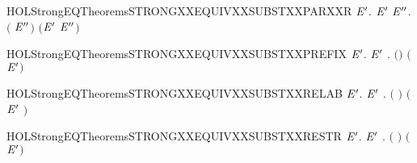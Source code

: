 \newcommand{\HOLStrongEQTheoremsSTRONGXXEQUIVXXSUBSTXXPARXXL}{\UseVerbatim{HOLStrongEQTheoremsSTRONGXXEQUIVXXSUBSTXXPARXXL}}
\begin{SaveVerbatim}{HOLStrongEQTheoremsSTRONGXXEQUIVXXSUBSTXXPARXXR}
\HOLTokenTurnstile{} \HOLSymConst{\HOLTokenForall{}} \ensuremath{\HOLBoundVar{E}\sp{\prime}}.
         \ensuremath{\HOLBoundVar{E}\sp{\prime}} \HOLSymConst{\HOLTokenImp{}}
       \HOLSymConst{\HOLTokenForall{}}\ensuremath{\HOLBoundVar{E}\sp{\prime\prime}}.  \ensuremath{(} \HOLSymConst{\ensuremath{\mid}} \ensuremath{\HOLBoundVar{E}\sp{\prime\prime}}\ensuremath{)} \ensuremath{(}\ensuremath{\HOLBoundVar{E}\sp{\prime}} \HOLSymConst{\ensuremath{\mid}} \ensuremath{\HOLBoundVar{E}\sp{\prime\prime}}\ensuremath{)}
\end{SaveVerbatim}
\newcommand{\HOLStrongEQTheoremsSTRONGXXEQUIVXXSUBSTXXPARXXR}{\UseVerbatim{HOLStrongEQTheoremsSTRONGXXEQUIVXXSUBSTXXPARXXR}}
\begin{SaveVerbatim}{HOLStrongEQTheoremsSTRONGXXEQUIVXXSUBSTXXPREFIX}
\HOLTokenTurnstile{} \HOLSymConst{\HOLTokenForall{}} \ensuremath{\HOLBoundVar{E}\sp{\prime}}.   \ensuremath{\HOLBoundVar{E}\sp{\prime}} \HOLSymConst{\HOLTokenImp{}} \HOLSymConst{\HOLTokenForall{}}.  \ensuremath{(}\HOLSymConst{\ensuremath{\ldotp}}\ensuremath{)} \ensuremath{(}\HOLSymConst{\ensuremath{\ldotp}}\ensuremath{\HOLBoundVar{E}\sp{\prime}}\ensuremath{)}
\end{SaveVerbatim}
\newcommand{\HOLStrongEQTheoremsSTRONGXXEQUIVXXSUBSTXXPREFIX}{\UseVerbatim{HOLStrongEQTheoremsSTRONGXXEQUIVXXSUBSTXXPREFIX}}
\begin{SaveVerbatim}{HOLStrongEQTheoremsSTRONGXXEQUIVXXSUBSTXXRELAB}
\HOLTokenTurnstile{} \HOLSymConst{\HOLTokenForall{}} \ensuremath{\HOLBoundVar{E}\sp{\prime}}.
         \ensuremath{\HOLBoundVar{E}\sp{\prime}} \HOLSymConst{\HOLTokenImp{}}
       \HOLSymConst{\HOLTokenForall{}}.  \ensuremath{(}  \ensuremath{)} \ensuremath{(} \ensuremath{\HOLBoundVar{E}\sp{\prime}} \ensuremath{)}
\end{SaveVerbatim}
\newcommand{\HOLStrongEQTheoremsSTRONGXXEQUIVXXSUBSTXXRELAB}{\UseVerbatim{HOLStrongEQTheoremsSTRONGXXEQUIVXXSUBSTXXRELAB}}
\begin{SaveVerbatim}{HOLStrongEQTheoremsSTRONGXXEQUIVXXSUBSTXXRESTR}
\HOLTokenTurnstile{} \HOLSymConst{\HOLTokenForall{}} \ensuremath{\HOLBoundVar{E}\sp{\prime}}.
         \ensuremath{\HOLBoundVar{E}\sp{\prime}} \HOLSymConst{\HOLTokenImp{}} \HOLSymConst{\HOLTokenForall{}}.  \ensuremath{(}  \ensuremath{)} \ensuremath{(}  \ensuremath{\HOLBoundVar{E}\sp{\prime}}\ensuremath{)}
\end{SaveVerbatim}
